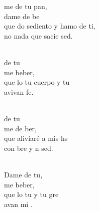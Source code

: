 \documentclass[12pt]{article}
\begin{document}
\begin{multicols*}{2}
\begin{cancion}%
	me de tu pan,\\
	dame de be\\
	que do sediento y hamo de ti,\\
	no  nada que sacie  sed.\\\jump\\
	\begin{chorus}%
	de tu \\
	me  beber,\\
	que lo tu cuerpo y tu   \\
	avivan  fe.\\
	\end{chorus}%
	\jump\\
	de tu \\
	me de ber,\\
	que  aliviaré a mis hs\\
	con bre y n sed.\\\jump\\
	\begin{chorus}%
	Dame de tu,\\
	me  beber,\\
	que lo tu  y tu gre\\
	avan mi .\\
	\end{chorus}%
	\jump\\
\end{cancion}%


\end{multicols*}
\end{document}
